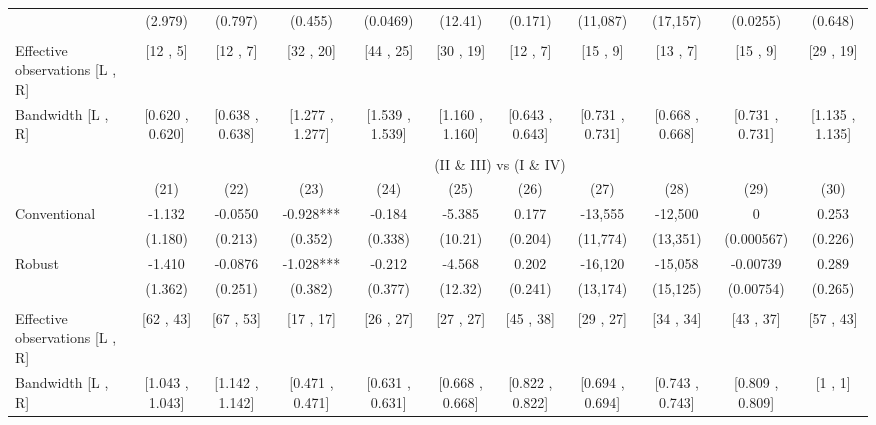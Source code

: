 \begin{tabular}{lcccccccccc}
      & (2.979) & (0.797) & (0.455) & (0.0469) & (12.41) & (0.171) & (11,087) & (17,157) & (0.0255) & (0.648) \\
      &       &       &       &       &       &       &       &       &       &  \\
\midrule
Effective observations [L , R] & [12 , 5] & [12 , 7] & [32 , 20] & [44 , 25] & [30 , 19] & [12 , 7] & [15 , 9] & [13 , 7] & [15 , 9] & [29 , 19] \\
Bandwidth [L , R] & [0.620 , 0.620] & [0.638 , 0.638] & [1.277 , 1.277] & [1.539 , 1.539] & [1.160 , 1.160] & [0.643 , 0.643] & [0.731 , 0.731] & [0.668 , 0.668] & [0.731 , 0.731] & [1.135 , 1.135] \\
\midrule
\midrule
      &       &       &       &       &       &       &       &       &       &  \\
\midrule
      & \multicolumn{10}{c}{(II \& III) vs (I \& IV)} \\
\midrule
\midrule
      & (21)  & (22)  & (23)  & (24)  & (25)  & (26)  & (27)  & (28)  & (29)  & (30) \\
\midrule
\midrule
Conventional & -1.132 & -0.0550 & -0.928*** & -0.184 & -5.385 & 0.177 & -13,555 & -12,500 & 0     & 0.253 \\
      & (1.180) & (0.213) & (0.352) & (0.338) & (10.21) & (0.204) & (11,774) & (13,351) & (0.000567) & (0.226) \\
Robust & -1.410 & -0.0876 & -1.028*** & -0.212 & -4.568 & 0.202 & -16,120 & -15,058 & -0.00739 & 0.289 \\
      & (1.362) & (0.251) & (0.382) & (0.377) & (12.32) & (0.241) & (13,174) & (15,125) & (0.00754) & (0.265) \\
      &       &       &       &       &       &       &       &       &       &  \\
\midrule
Effective observations [L , R] & [62 , 43] & [67 , 53] & [17 , 17] & [26 , 27] & [27 , 27] & [45 , 38] & [29 , 27] & [34 , 34] & [43 , 37] & [57 , 43] \\
Bandwidth [L , R] & [1.043 , 1.043] & [1.142 , 1.142] & [0.471 , 0.471] & [0.631 , 0.631] & [0.668 , 0.668] & [0.822 , 0.822] & [0.694 , 0.694] & [0.743 , 0.743] & [0.809 , 0.809] & [1 , 1] \\
\bottomrule
\bottomrule
\end{tabular}%
